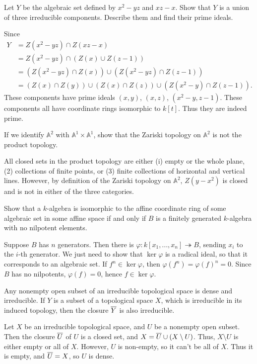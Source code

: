 \begin{questions}
\question Let $Y$ be the algebraic set defined by $x^2 - yz$ and $xz - x$. Show
that $Y$ is a union of three irreducible components. Describe them and find
their prime ideals.
\begin{solution}
Since \begin{align*}
Y & = Z(x^2 - yz) \cap Z(xz - x) \\
& = Z(x^2 - yz) \cap (Z(x) \cup Z(z - 1)) \\
& = (Z(x^2 - yz) \cap Z(x)) \cup (Z(x^2 - yz) \cap Z(z - 1)) \\
& = (Z(x) \cap Z(y)) \cup (Z(x) \cap Z(z)) \cup (Z(x^2 - y) \cap Z(z - 1)).
\end{align*}
These components have prime ideals $(x, y)$, $(x, z)$, $(x^2 - y, z - 1)$. These
components all have coordinate rings isomorphic to $k[t]$. Thus they are
indeed prime.
\end{solution}

\question If we identify $\mathbb{A}^2$ with $\mathbb{A}^1 \times \mathbb{A}^1$,
show that the Zariski topology on $\mathbb{A}^2$ is not the product topology.
\begin{solution}
All closed sets in the product topology are either (i) empty or the whole plane,
(2) collections of finite points, or (3) finite collections of horizontal and
vertical lines. However, by definition of the Zariski topology on $\mathbb
{A}^2$, $Z(y - x^2)$ is closed and is not in either of the three categories.
\end{solution}

\question Show that a $k$-algebra is isomorphic to the affine coordinate ring of
some algebraic set in some affine space if and only if $B$ is a finitely
generated $k$-algebra with no nilpotent elements.
\begin{solution}
Suppose $B$ has $n$ generators. Then there is $\varphi: k[x_1, ..., x_n]
\twoheadrightarrow B$, sending $x_i$ to the $i$-th generator. We just need to
show that $\ker \varphi$ is a radical ideal, so that it corresponds to an
algebraic set. If $f^n \in \ker \varphi$, then $\varphi(f^n) = \varphi(f)^n =
0$. Since $B$ has no nilpotents, $\varphi(f) = 0$, hence $f \in \ker \varphi$.
\end{solution}

\question Any nonempty open subset of an irreducible topological space is dense
and irreducible. If $Y$ is a subset of a topological space $X$, which is
irreducible in its induced topology, then the closure $\overline{Y}$ is also
irreducible.
\begin{solution}
Let $X$ be an irreducible topological space, and $U$ be a nonempty open
subset. Then the closure $\overline{U}$ of $U$ is a closed set, and $X = \overline{U}
\cup (X \setminus U)$. Thus, $X \setminus U$ is either empty or all of $X$.
However, $U$ is non-empty, so it can't be all of $X$. Thus it is empty, and
$\overline{U} = X$, so $U$ is dense.


\end{solution}
\end{questions}
